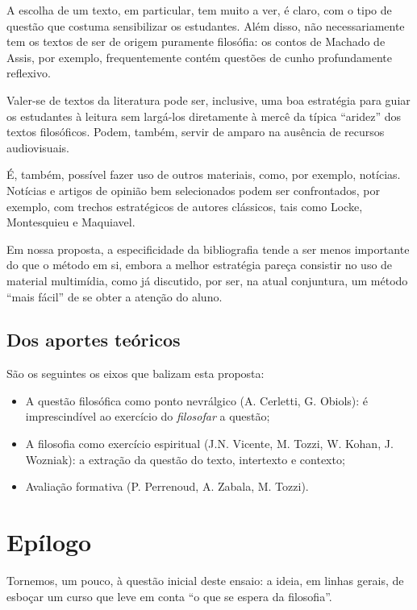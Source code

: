 \documentclass[12pt,a4paper]{article}
\newenvironment{citac}{
	\begin{addmargin}[4cm]{1em} \footnotesize}{\normalfont \end{addmargin}
}
\begin{document}
\begin{citac}
	A escolha de um texto, em particular, tem muito a ver, é claro, 
	com o tipo de questão que costuma sensibilizar os estudantes. 
	Além disso, não necessariamente tem os textos de ser de origem 
	puramente filosófia: os contos de Machado de Assis, por exemplo, 
	frequentemente contém questões de cunho profundamente reflexivo. 

	Valer-se de textos da literatura pode ser, inclusive, uma boa 
	estratégia para guiar os estudantes à leitura sem largá-los 
	diretamente à mercê da típica “aridez” dos textos filosóficos. 
	Podem, também, servir de amparo na ausência de recursos 
	audiovisuais. 

	É, também, possível fazer uso de outros materiais, como, por exemplo, 
	notícias. Notícias e artigos de opinião bem selecionados podem ser 
	confrontados, por exemplo, com trechos estratégicos de autores 
	clássicos, tais como Locke, Montesquieu e Maquiavel. 

	Em nossa proposta, a especificidade da bibliografia tende a ser 
	menos importante do que o método em si, embora a melhor estratégia 
	pareça consistir no uso de material multimídia, como já discutido, 
	por ser, na atual conjuntura, um método “mais fácil” de se obter 
	a atenção do aluno. 

	\subsection{Dos aportes teóricos}

	São os seguintes os eixos que balizam esta proposta: 
	
	\begin{itemize}
		\item A questão filosófica como ponto nevrálgico (A. Cerletti, 
		G. Obiols): é imprescindível ao exercício do \emph{filosofar} 
		a questão; 
		\item A filosofia como exercício espiritual (J.N. Vicente, 
		M. Tozzi, W. Kohan, J. Wozniak): a extração da questão do 
		texto, intertexto e contexto; 
		\item Avaliação formativa (P. Perrenoud, A. Zabala, M. Tozzi).  
	\end{itemize}

	\newpage

	\section{Epílogo}

	Tornemos, um pouco, à questão inicial deste ensaio: a ideia, em linhas 
	gerais, de esboçar um curso que leve em conta “o que se espera da 
	filosofia”. 


\end{citac}
\end{document}
